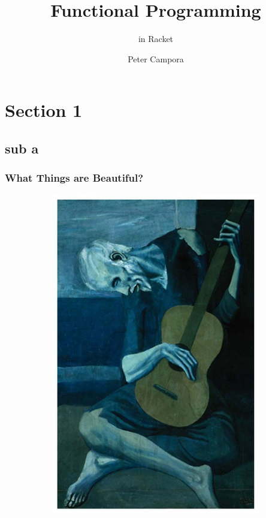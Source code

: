 \documentclass{beamer}
\title{Functional Programming}
\subtitle{in Racket}
\author{Peter Campora}
\institute{ULL}
\begin{document}
\begin{frame}
\titlepage
\end{frame}

\section{Section 1}
\subsection{sub a}
 
\begin{frame}
  \frametitle{What Things are Beautiful?}
  \begin{figure}[t]
    \begin{subfigure}[b]{.3\textwidth}
      \includegraphics[width=.9\textwidth]{images/old-guitarist.jpg}       
    \end{subfigure}
    \pause

\end{figure}
\end{frame}
\end{document}
